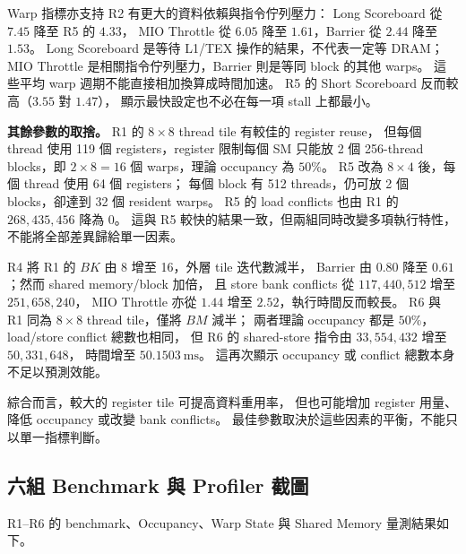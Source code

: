 \documentclass[UTF8,fontset=none,11pt,a4paper]{ctexart}
\begin{document}
Warp 指標亦支持 R2 有更大的資料依賴與指令佇列壓力：
Long Scoreboard 從 $7.45$ 降至 R5 的 $4.33$，
MIO Throttle 從 $6.05$ 降至 $1.61$，Barrier 從 $2.44$ 降至 $1.53$。
Long Scoreboard 是等待 L1/TEX 操作的結果，不代表一定等 DRAM；
MIO Throttle 是相關指令佇列壓力，Barrier 則是等同 block 的其他 warps。
這些平均 warp 週期不能直接相加換算成時間加速。
R5 的 Short Scoreboard 反而較高（$3.55$ 對 $1.47$），
顯示最快設定也不必在每一項 stall 上都最小。

\textbf{其餘參數的取捨。}
R1 的 $8\times8$ thread tile 有較佳的 register reuse，
但每個 thread 使用 119 個 registers，register 限制每個 SM 只能放 2 個
256-thread blocks，即 $2\times8=16$ 個 warps，理論 occupancy 為 $50\%$。
R5 改為 $8\times4$ 後，每個 thread 使用 64 個 registers；
每個 block 有 512 threads，仍可放 2 個 blocks，卻達到 32 個 resident warps。
R5 的 load conflicts 也由 R1 的 $268{,}435{,}456$ 降為 0。
這與 R5 較快的結果一致，但兩組同時改變多項執行特性，
不能將全部差異歸給單一因素。

R4 將 R1 的 $BK$ 由 8 增至 16，外層 tile 迭代數減半，
Barrier 由 $0.80$ 降至 $0.61$；然而 shared memory/block 加倍，
且 store bank conflicts 從 $117{,}440{,}512$ 增至 $251{,}658{,}240$，
MIO Throttle 亦從 $1.44$ 增至 $2.52$，執行時間反而較長。
R6 與 R1 同為 $8\times8$ thread tile，僅將 $BM$ 減半；
兩者理論 occupancy 都是 $50\%$，load/store conflict 總數也相同，
但 R6 的 shared-store 指令由 $33{,}554{,}432$ 增至 $50{,}331{,}648$，
時間增至 $50.1503\ \mathrm{ms}$。
這再次顯示 occupancy 或 conflict 總數本身不足以預測效能。

綜合而言，較大的 register tile 可提高資料重用率，
但也可能增加 register 用量、降低 occupancy 或改變 bank conflicts。
最佳參數取決於這些因素的平衡，不能只以單一指標判斷。

\clearpage
\subsection*{六組 Benchmark 與 Profiler 截圖}

R1--R6 的 benchmark、Occupancy、Warp State 與 Shared Memory 量測結果如下。
\end{document}
